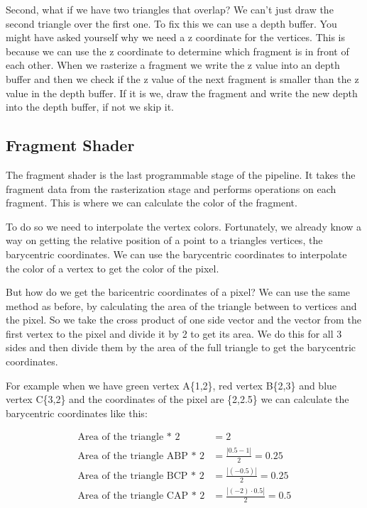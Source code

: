 \documentclass[12pt]{report} \usepackage{preamble}
\begin{document}
Second, what if we have two triangles that overlap?
We can't just draw the second triangle over the first one.
To fix this we can use a depth buffer. You might have asked yourself why
we need a z coordinate for the vertices. This is because we can use the z coordinate
to determine which fragment is in front of each other. When we rasterize a fragment
we write the z value into an depth buffer and then we check if the z value of the next fragment is
smaller than the z value in the depth buffer. If it is we, draw the fragment and write the new depth
into the depth buffer, if not we skip it.

\subsection{Fragment Shader}

The fragment shader is the last programmable stage of the pipeline.
It takes the fragment data from the rasterization stage and performs
operations on each fragment. This is where we can calculate the color of the fragment.

To do so we need to interpolate the vertex colors.
Fortunately, we already know a way on getting the relative position
of a point to a triangles vertices, the barycentric coordinates.
We can use the barycentric coordinates to interpolate
the color of a vertex to get the color of the pixel.

But how do we get the baricentric coordinates of a pixel?
We can use the same method as before, by calculating the area of the triangle
between to vertices and the pixel. So we take the cross product of one side vector
and the vector from the first vertex to the pixel
and divide it by 2 to get its area. We do this for all 3 sides and then divide them
by the area of the full triangle to get the barycentric coordinates.

For example when we have green vertex A\{1,2\}, red vertex B\{2,3\}
and blue vertex C\{3,2\} and the coordinates of the pixel are
\{2,2.5\} we can calculate the barycentric coordinates like this:

\[
	\begin{aligned}
		\text{Area of the triangle * 2}     & = 2                                             \\
		\text{Area of the triangle ABP * 2} & = \frac{\left| 0.5 - 1 \right|}{2} = 0.25       \\
		\text{Area of the triangle BCP * 2} & = \frac{\left| (-0.5) \right|}{2} = 0.25        \\
		\text{Area of the triangle CAP * 2} & = \frac{\left| (-2) \cdot 0.5 \right|}{2} = 0.5 \\
	\end{aligned}
\]
\end{document}
